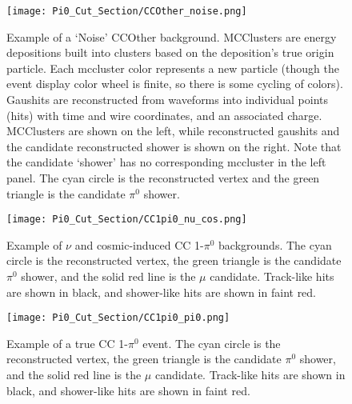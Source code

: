 \begin{figure}[H]
\centering
\texttt{[image: Pi0\_Cut\_Section/CCOther\_noise.png]}
\caption{ Example of a `Noise' CCOther background. MCClusters are energy depositions built into clusters based on the deposition’s true origin particle. Each mccluster color represents a new particle (though the event display color wheel is finite, so there is some cycling of colors).  Gaushits are reconstructed from waveforms into individual points (hits) with time and wire coordinates, and an associated charge. MCClusters are shown on the left, while reconstructed gaushits and the candidate reconstructed shower is shown on the right.
 Note that the candidate `shower' has no corresponding mccluster in the left panel. The cyan circle is the reconstructed vertex and the green triangle is the candidate $\pi^0$ shower.  }
\label{fig:ccoth_bkgd_noise}
\end{figure}

\begin{figure}[H]
\centering
\texttt{[image: Pi0\_Cut\_Section/CC1pi0\_nu\_cos.png]}
\caption{ Example of $\nu$ and cosmic-induced CC 1-$\pi^0$ backgrounds. The cyan circle is the reconstructed vertex, the green triangle is the candidate $\pi^0$ shower, and the solid red line is the $\mu$ candidate. Track-like hits are shown in black, and shower-like hits are shown in faint red. }
\label{fig:cc1pi0_nu_cos}
\end{figure}

\begin{figure}[H]
\centering
\texttt{[image: Pi0\_Cut\_Section/CC1pi0\_pi0.png]}
\caption{ Example of a true CC 1-$\pi^0$ event. The cyan circle is the reconstructed vertex, the green triangle is the candidate $\pi^0$ shower, and the solid red line is the $\mu$ candidate. Track-like hits are shown in black, and shower-like hits are shown in faint red. }
\label{fig:cc1pi0_pi0}
\end{figure}
